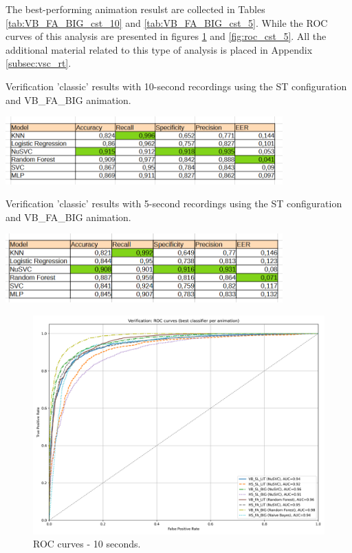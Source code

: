 \documentclass[12pt]{report}
\begin{document}
The best-performing animation resulst are collected in Tables \ref{tab:VB_FA_BIG_cst_10} and \ref{tab:VB_FA_BIG_cst_5}.
While the ROC  curves of this analysis are presented in figures \ref{fig:roc_cst_10} and \ref{fig:roc_cst_5}.
All the additional material related to this type of analysis is placed in Appendix \ref{subsec:vsc_rt}.

\begin{table}[ht]
    \centering
    \caption{Verification ’classic’ results with 10-second recordings using the ST configuration and VB\_FA\_BIG animation.}
    \includegraphics[width=0.8\textwidth]{Images/Results/Classic_procedure/five_ten/st/ten/VB_FA_BIG.png}
    \label{tab:VB_FA_BIG_cst_10}
\end{table}

\begin{table}[ht]
    \centering
    \caption{Verification ’classic’ results with 5-second recordings using the ST configuration and VB\_FA\_BIG animation.}
    \includegraphics[width=0.8\textwidth]{Images/Results/Classic_procedure/five_ten/st/five/VB_FA_BIG.png}
    \label{tab:VB_FA_BIG_cst_5}
\end{table}


\begin{figure}[ht]
    \centering
    \includegraphics[width = 0.6
    \textwidth]{Images/Results/Classic_procedure/five_ten/st/ten/Verification_single_roc_classic_ten_st.png}
    \caption{ROC curves - 10 seconds.}
    \label{fig:roc_cst_10}
\end{figure}
\end{document}
